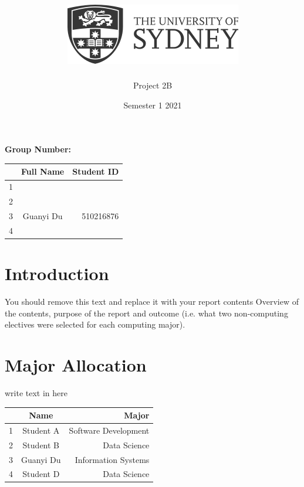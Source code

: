 \documentclass[12pt]{article}
\title{\includegraphics[scale=.5]{usydlogo.png}
\linebreak \\
\noindent \scalebox{1}{\helveticafamily INFO1111: Computing 1A Professionalism}
}
\date{Semester 1 2021}
\author{Project 2B}
\newcommand\helveticafamily{\fontfamily{phv} \selectfont}
\begin{document}

\maketitle
\begin{center}
    \textbf{Group Number:}
\end{center}


\begin{center}
\begin{tabular}{|l|c|r|}
\hline
  & Full Name & Student ID \\ \hline
1 &           &            \\ \hline
2 &           &            \\ \hline
3 & Guanyi Du & 510216876  \\ \hline
4 &           &            \\ \hline
\end{tabular}
\end{center}

\thispagestyle{empty}

\newpage

\setcounter{page}{1}
\newpage
\section{Introduction}
You should remove this text and replace it with your report contents
Overview of the contents, purpose of the report and outcome (i.e. what two non-computing electives were selected for each computing major).

\newpage
\section{Major Allocation}
write text in here
\begin{center}
\begin{tabular}{|l|c|r|}
\hline
  & Name      & Major                \\ \hline
1 & Student A & Software Development \\ \hline
2 & Student B & Data Science        \\ \hline
3 & Guanyi Du & Information Systems  \\ \hline
4 & Student D & Data Science         \\ \hline
\end{tabular}
\end{center}
\end{document}
